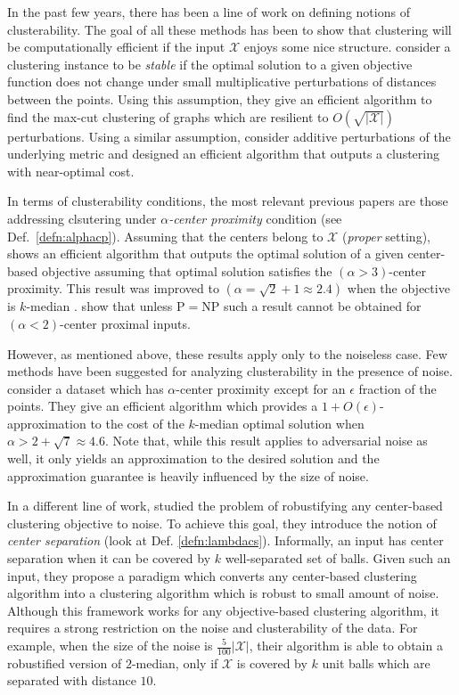 \documentclass[orivec]{llncs}
\newcommand{\mc}{\mathcal}
\begin{document}
In the past few years, there has been a line of work on defining notions of clusterability. The goal of all these methods has been to show that clustering will be computationally efficient if the input $\mc X$ enjoys some nice structure. \cite{bilu2012stable} consider a clustering instance to be \emph{stable} if the optimal solution to a given objective function does not change under small multiplicative perturbations of distances between the points. Using this assumption, they give an efficient algorithm to find the max-cut clustering of graphs which are resilient to $O(\sqrt{|\mc X|})$ perturbations. Using a similar assumption, \cite{ackerman2009clusterability} consider additive perturbations of the underlying metric and designed an efficient algorithm that outputs a clustering with near-optimal cost. 


In terms of clusterability conditions, the most relevant previous papers are those addressing clsutering under {\em $\alpha$-center proximity} condition (see Def.~\ref{defn:alphacp}).
Assuming that the centers belong to $\mc X$ ({\em proper} setting),  \cite{awasthi2012center} shows an efficient algorithm that outputs the optimal solution of a given center-based objective assuming that optimal solution satisfies the $(\alpha > 3)$-center proximity. This result was improved to $(\alpha = \sqrt{2} + 1 \approx 2.4)$ when the objective is $k$-median \cite{balcan2012clustering}. \cite{ben2014data} show that unless P$=$NP such a result cannot be obtained for $(\alpha <2)$-center proximal inputs.

However, as mentioned above, these results apply only to the noiseless case.
Few methods have been suggested for analyzing clusterability in the presence of noise. 
\cite{balcan2012clustering} consider a dataset which has $\alpha$-center proximity except for an $\epsilon$ fraction of the points. They give an efficient algorithm which provides a $1+O(\epsilon)$-approximation to the cost of the $k$-median optimal solution when $\alpha > 2+\sqrt{7} \approx 4.6$. Note that, while this result applies to adversarial noise as well, it only yields an approximation to the desired solution and  the approximation guarantee is heavily influenced by the size of noise. 

In a different line of work, \cite{ben2014clustering} studied the problem of robustifying any center-based clustering objective to noise. To achieve this goal, they introduce the notion of {\em center separation} (look at Def. \ref{defn:lambdacs}). Informally, an input has center separation when it can be covered by $k$ well-separated set of balls.
Given such an input, they propose a paradigm which converts any center-based clustering algorithm into a clustering algorithm which is robust to small amount of noise.
Although this framework works for any objective-based clustering algorithm, it requires a strong restriction on the noise and clusterability of the data. For example, when the size of the noise is $\frac{5}{100}|\mc X|$, their algorithm is able to obtain a robustified version of $2$-median, only if $\mc X$ is covered by $k$ unit balls which are separated with distance $10$. 
\end{document}
